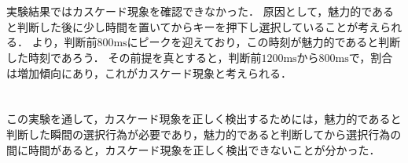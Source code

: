 \section{\consideration}
実験結果ではカスケード現象を確認できなかった．
原因として，魅力的であると判断した後に少し時間を置いてからキーを押下し選択していることが考えられる．
より，判断前\(800\textrm{ms}\)にピークを迎えており，この時刻が魅力的であると判断した時刻であろう．
その前提を真とすると，判断前\(1200\textrm{ms}\)から\(800\textrm{ms}\)で，割合は増加傾向にあり，これがカスケード現象と考えられる．
\section{\conclusion}
この実験を通して，カスケード現象を正しく検出するためには，魅力的であると判断した瞬間の選択行為が必要であり，魅力的であると判断してから選択行為の間に時間があると，カスケード現象を正しく検出できないことが分かった．
